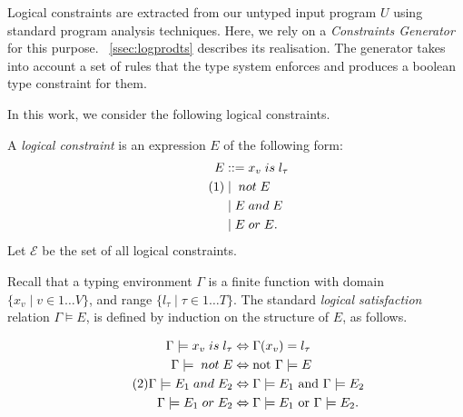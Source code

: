 \documentclass[acmsmall, review, anonymous]{acmart}\settopmatter{printfolios=true,printccs=false,printacmref=false}
\newcommand\numberthis{\addtocounter{equation}{1}\tag{\theequation}}
\begin{document}

Logical constraints are extracted from our untyped input program $U$ using
standard program analysis techniques.  Here, we rely on a \emph{Constraints
	Generator} for this purpose. ~\autoref{ssec:logprodts} describes its
realisation.  The generator takes into account a set of rules that the type system
enforces and produces a boolean type constraint for them.

In this work, we consider the following logical constraints.
\begin{definition}\label{def:log-gram}
	A \emph{logical constraint} is an expression $E$ of the following form:
	\begin{align*}
		E & ::= x_v \mathrel{is} l_\tau \\ \numberthis\label{eq:gram}
		  & \mid{} \mathrel{not} E      \\
		  & \mid E \mathrel{and} E      \\
		  & \mid E \mathrel{or} E.
	\end{align*}
	Let $\mathcal{E}$ be the set of all logical constraints.
\end{definition}

Recall that a typing environment $\Gamma$ is a finite function
with domain $\{ x_v \mid v \in 1 \ldots V\}$, and range $\{ l_\tau \mid \tau \in 1 \dots T \}$.
The standard \emph{logical satisfaction} relation $\Gamma \models E$, is defined by induction on the structure of $E$, as follows.


          \begin{align*} 
              \Gamma \models x_v \mathrel{is} l_\tau & \Leftrightarrow \Gamma(x_v)=l_\tau                                  \\
              \Gamma \models{} \mathrel{not} E       & \Leftrightarrow{} \mbox{not $\Gamma \models E$}                    \\ \numberthis \label{eq:logsat}
              \Gamma \models E_1 \mathrel{and} E_2   & \Leftrightarrow
              \mbox{$\Gamma \models E_1$ and $\Gamma \models E_2$} \\
              \Gamma \models E_1 \mathrel{or} E_2
                                                     & \Leftrightarrow
        \mbox{$\Gamma \models E_1$ or $\Gamma \models E_2$.}
          \end{align*}
\end{document}
